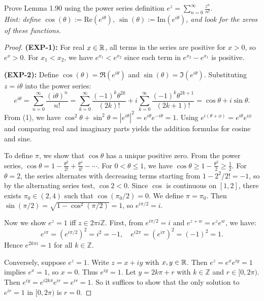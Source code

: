 \documentclass{article}
\begin{document}
Prove Lemma 1.90 using the power series definition
$e^z = \sum_{n=0}^{\infty} \frac{z^n}{n!}$. \\
\textit{Hint: define $\cos(\theta) := \text{Re}(e^{i\theta})$,
  $\sin(\theta) := \text{Im}(e^{i\theta})$, and look for the zeros of
these functions.}

\begin{proof}
  \textbf{(EXP-1):} For real $x \in \mathbb{R}$, all terms in the series are
  positive for $x > 0$, so $e^x > 0$. For $x_1 < x_2$, we have
  $e^{x_1} < e^{x_2}$ since each term in $e^{x_2} - e^{x_1}$ is positive.

  \textbf{(EXP-2):} Define $\cos(\theta) = \Re(e^{i\theta})$ and
  $\sin(\theta) = \Im(e^{i\theta})$. Substituting $z = i\theta$ into the
  power series:
  \[
    e^{i\theta} = \sum_{n=0}^{\infty} \frac{(i\theta)^n}{n!}
    = \sum_{k=0}^{\infty} \frac{(-1)^k \theta^{2k}}{(2k)!}
    + i \sum_{k=0}^{\infty} \frac{(-1)^k \theta^{2k+1}}{(2k+1)!}
    = \cos\theta + i\sin\theta.
    \tag{1}
  \]
  From (1), we have $\cos^2\theta + \sin^2\theta = |e^{i\theta}|^2
  = e^{i\theta}e^{-i\theta} = 1$. Using $e^{i(\theta+\phi)} =
  e^{i\theta}e^{i\phi}$ and comparing real and imaginary parts yields
  the addition formulas for cosine and sine.

  To define $\pi$, we show that $\cos\theta$ has a unique positive zero.
  From the power series, $\cos\theta = 1 - \frac{\theta^2}{2!} +
  \frac{\theta^4}{4!} - \cdots$.
  For $0 < \theta \le 1$, we have $\cos\theta \ge 1 -
  \frac{\theta^2}{2} \ge \frac{1}{2}$.
  For $\theta = 2$, the series alternates with decreasing terms starting
  from $1 - 2^2/2! = -1$, so by the alternating series test, $\cos 2 < 0$.
  Since $\cos$ is continuous on $[1, 2]$, there exists
  $\pi_0 \in (2, 4)$ such that $\cos(\pi_0/2) = 0$. We define $\pi = \pi_0$.
  Then $\sin(\pi/2) = \sqrt{1 - \cos^2(\pi/2)} = 1$, so $e^{i\pi/2} = i$.

  Now we show $e^z = 1$ iff $z \in 2\pi i\mathbb{Z}$. First, from
  $e^{i\pi/2} = i$
  and $e^{z+w} = e^z e^w$, we have:
  \[
    e^{i\pi} = (e^{i\pi/2})^2 = i^2 = -1, \quad
    e^{i2\pi} = (e^{i\pi})^2 = (-1)^2 = 1.
  \]
  Hence $e^{2k\pi i} = 1$ for all $k \in \mathbb{Z}$.

  Conversely, suppose $e^z = 1$. Write $z = x + iy$ with $x, y \in \mathbb{R}$.
  Then $e^z = e^x e^{iy} = 1$ implies $e^x = 1$, so $x = 0$. Thus $e^{iy} = 1$.
  Let $y = 2k\pi + r$ with $k \in \mathbb{Z}$ and $r \in [0, 2\pi)$. Then
  $e^{iy} = e^{i2k\pi} e^{ir} = e^{ir} = 1$. So it suffices to show that
  the only solution to $e^{ir} = 1$ in $[0, 2\pi)$ is $r = 0$.


\end{proof}
\end{document}
